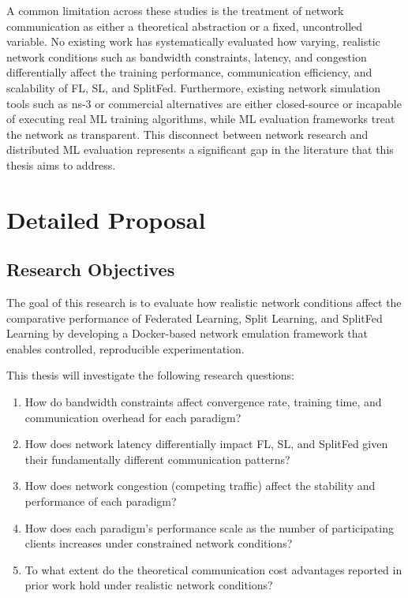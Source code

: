 \documentclass[12pt]{article}
\begin{document}
A common limitation across these studies is the treatment of network communication as either a theoretical abstraction or a fixed, uncontrolled variable. No existing work has systematically evaluated how varying, realistic network conditions such as bandwidth constraints, latency, and congestion differentially affect the training performance, communication efficiency, and scalability of FL, SL, and SplitFed. Furthermore, existing network simulation tools such as ns-3 or commercial alternatives are either closed-source or incapable of executing real ML training algorithms, while ML evaluation frameworks treat the network as transparent. This disconnect between network research and distributed ML evaluation represents a significant gap in the literature that this thesis aims to address.

\section{Detailed Proposal}

\subsection{Research Objectives}

The goal of this research is to evaluate how realistic network conditions affect the comparative performance of Federated Learning, Split Learning, and SplitFed Learning by developing a Docker-based network emulation framework that enables controlled, reproducible experimentation.

This thesis will investigate the following research questions:

\begin{enumerate}
    \item How do bandwidth constraints affect convergence rate, training time, and communication overhead for each paradigm?
    \item How does network latency differentially impact FL, SL, and SplitFed given their fundamentally different communication patterns?
    \item How does network congestion (competing traffic) affect the stability and performance of each paradigm?
    \item How does each paradigm's performance scale as the number of participating clients increases under constrained network conditions?
    \item To what extent do the theoretical communication cost advantages reported in prior work \cite{thapa2022, singh2019} hold under realistic network conditions?
\end{enumerate}
\end{document}
